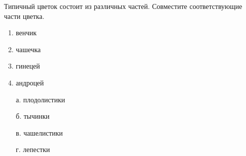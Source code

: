 
Типичный
цветок состоит из различных частей. Совместите соответствующие части цветка.

\begin{multicols}{2}
    {
        \begin{enumerate}
            \item венчик
            \item чашечка
            \item гинецей
            \item андроцей
        \end{enumerate}
    }
    {
        \begin{enumerate}
            \item[а.] плодолистики
            \item[б.] тычинки
            \item[в.] чашелистики
            \item[г.] лепестки
        \end{enumerate}
    }
\end{multicols}

